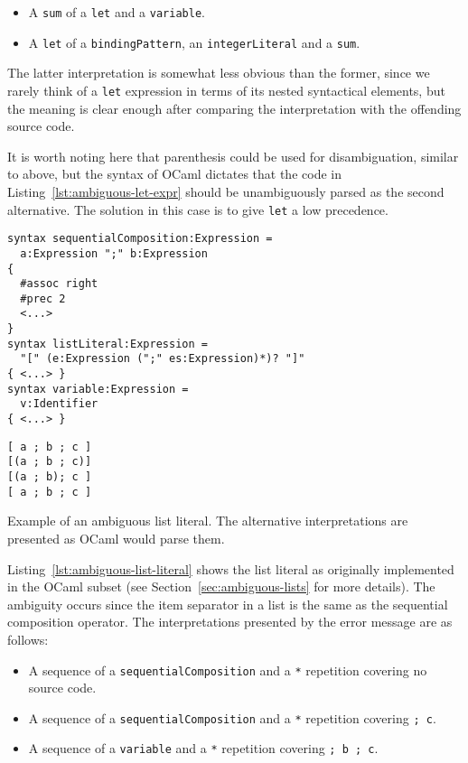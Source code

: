 \documentclass{kththesis}
\begin{document}
\begin{itemize}
  \item A \texttt{sum} of a \texttt{let} and a \texttt{variable}.
  \item A \texttt{let} of a \texttt{bindingPattern}, an \texttt{integerLiteral} and a \texttt{sum}.
\end{itemize}

The latter interpretation is somewhat less obvious than the former, since we rarely think of a \texttt{let} expression in terms of its nested syntactical elements, but the meaning is clear enough after comparing the interpretation with the offending source code.

It is worth noting here that parenthesis could be used for disambiguation, similar to above, but the syntax of OCaml dictates that the code in Listing~\ref{lst:ambiguous-let-expr} should be unambiguously parsed as the second alternative. The solution in this case is to give \texttt{let} a low precedence.

\begin{listing}[h]
\begin{verbatim}
syntax sequentialComposition:Expression =
  a:Expression ";" b:Expression
{
  #assoc right
  #prec 2
  <...>
}
syntax listLiteral:Expression =
  "[" (e:Expression (";" es:Expression)*)? "]"
{ <...> }
syntax variable:Expression =
  v:Identifier
{ <...> }
\end{verbatim}
\begin{verbatim}
[ a ; b ; c ]
[(a ; b ; c)]
[(a ; b); c ]
[ a ; b ; c ]
\end{verbatim}
\caption{Example of an ambiguous list literal. The alternative interpretations are presented as OCaml would parse them.}
\label{lst:ambiguous-list-literal}
\end{listing}

Listing~\ref{lst:ambiguous-list-literal} shows the list literal as originally implemented in the OCaml subset (see Section~\ref{sec:ambiguous-lists} for more details). The ambiguity occurs since the item separator in a list is the same as the sequential composition operator. The interpretations presented by the error message are as follows:

\begin{itemize}
  \item A sequence of a \texttt{sequentialComposition} and a \texttt{*} repetition covering no source code.
  \item A sequence of a \texttt{sequentialComposition} and a \texttt{*} repetition covering \texttt{; c}.
  \item A sequence of a \texttt{variable} and a \texttt{*} repetition covering \texttt{; b ; c}.
\end{itemize}
\end{document}
